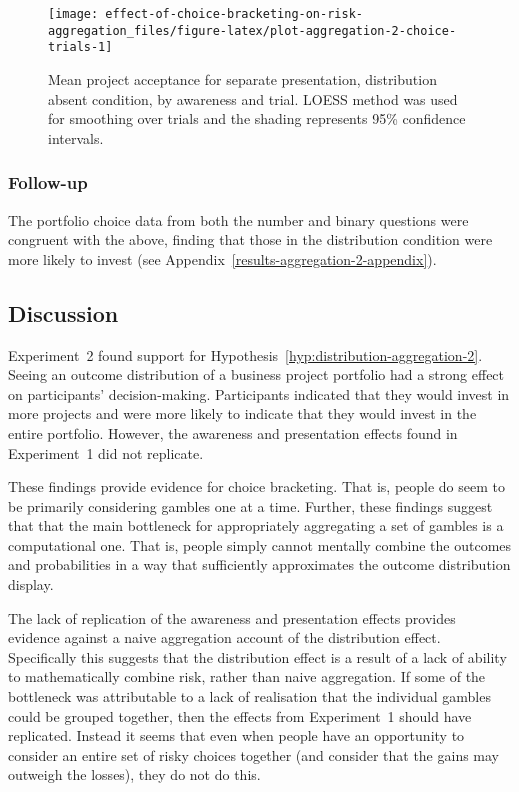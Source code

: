\documentclass[
  english,
  man, donotrepeattitle,floatsintext]{apa7}
\theoremstyle{definition}
\theoremstyle{definition}
\theoremstyle{definition}
\theoremstyle{definition}
\theoremstyle{remark}
\begin{document}
\begin{figure}
\texttt{[image: effect-of-choice-bracketing-on-risk-aggregation\_files/figure-latex/plot-aggregation-2-choice-trials-1]} \caption{Mean project acceptance for separate presentation, distribution absent condition, by awareness and trial. LOESS method was used for smoothing over trials and the shading represents 95\% confidence intervals.}\label{fig:plot-aggregation-2-choice-trials}
\end{figure}

\hypertarget{follow-up}{%
\subsubsection{Follow-up}\label{follow-up}}

The portfolio choice data from both the number and binary questions were
congruent with the above, finding that those in the distribution condition were
more likely to invest (see Appendix~\ref{results-aggregation-2-appendix}).

\hypertarget{discussion-aggregation-4}{%
\subsection{Discussion}\label{discussion-aggregation-4}}

Experiment~2 found support for
Hypothesis~\ref{hyp:distribution-aggregation-2}. Seeing an outcome
distribution of a business project portfolio had a strong effect on
participants' decision-making. Participants indicated that they would invest in
more projects and were more likely to indicate that they would invest in the
entire portfolio. However, the awareness and presentation effects found in
Experiment~1 did not replicate.

These findings provide evidence for choice bracketing. That is, people do seem
to be primarily considering gambles one at a time. Further, these findings
suggest that that the main bottleneck for appropriately aggregating a set of
gambles is a computational one. That is, people simply cannot mentally combine
the outcomes and probabilities in a way that sufficiently approximates the
outcome distribution display.

The lack of replication of the awareness and presentation effects provides
evidence against a naive aggregation account of the distribution effect.
Specifically this suggests that the distribution effect is a result of a lack of
ability to mathematically combine risk, rather than naive aggregation. If some
of the bottleneck was attributable to a lack of realisation that the individual
gambles could be grouped together, then the effects from Experiment~1 should
have replicated. Instead it seems that even when people have an opportunity to
consider an entire set of risky choices together (and consider that the gains
may outweigh the losses), they do not do this.
\end{document}
